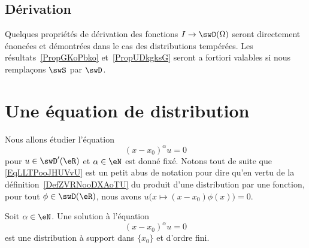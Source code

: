 \subsection{Dérivation}

Quelques propriétés de dérivation des fonctions \( I\to \swD(\Omega)\) seront directement énoncées et démontrées dans le cas des distributions tempérées. Les résultats~\ref{PropGKoPbko} et~\ref{PropUDkgksG} seront a fortiori valables si nous remplaçons \( \swS\) par \( \swD\).

\section{Une équation de distribution}

Nous allons étudier l'équation
\begin{equation}    \label{EqLLTPooJHUVvU}
    (x-x_0)^{\alpha}u=0
\end{equation}
pour \( u\in\swD'(\eR)\) et \( \alpha\in \eN\) est donné fixé. Notons tout de suite que \eqref{EqLLTPooJHUVvU} est un petit abus de notation pour dire qu'en vertu de la définition~\ref{DefZVRNooDXAoTU} du produit d'une distribution par une fonction, pour tout \( \phi\in\swD(\eR)\), nous avons \( u\Big( x\mapsto (x-x_0)\phi(x) \Big)=0\).

\begin{lemma}       \label{LemWIGKooQpGXoI}
    Soit \( \alpha\in \eN\). Une solution à l'équation
    \begin{equation}        \label{EqKVNEooJNwsPc}
        (x-x_0)^{\alpha}u=0
    \end{equation}
    est une distribution à support dans \( \{ x_0 \}\) et d'ordre fini.
\end{lemma}

